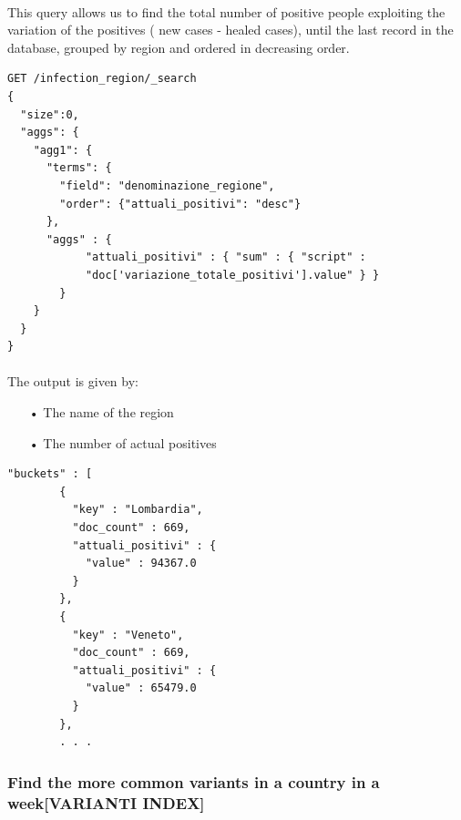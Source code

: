 \documentclass[a4paper,12pt]{article}
\begin{document}
\paragraph{} This query allows us to find the total number of positive people exploiting the variation of the positives ( new cases - healed cases), until the last record in the database, grouped by region and ordered in decreasing order.
\begin{tcolorbox}[colback=green!5!white,colframe=green!75!black,title=QUERY]
\begin{verbatim}
GET /infection_region/_search
{ 
  "size":0,
  "aggs": {
    "agg1": {
      "terms": {
        "field": "denominazione_regione",
        "order": {"attuali_positivi": "desc"}
      },
      "aggs" : {
            "attuali_positivi" : { "sum" : { "script" : 
            "doc['variazione_totale_positivi'].value" } }
        }
    }
  }
}
\end{verbatim}
\end{tcolorbox}
\newpage

\paragraph{} The output is given by: 
\begin{itemize}[noitemsep]
\item[•] The name of the region
\item[•] The number of actual positives
\end{itemize}

\begin{tcolorbox}[colback=red!5!white,colframe=red!75!black,title=OUTPUT]
\begin{verbatim}
"buckets" : [
        {
          "key" : "Lombardia",
          "doc_count" : 669,
          "attuali_positivi" : {
            "value" : 94367.0
          }
        },
        {
          "key" : "Veneto",
          "doc_count" : 669,
          "attuali_positivi" : {
            "value" : 65479.0
          }
        },
        . . .
\end{verbatim}
\end{tcolorbox}
\newpage

\subsubsection{Find the more common variants in a country in a week[VARIANTI INDEX]  }
\end{document}
